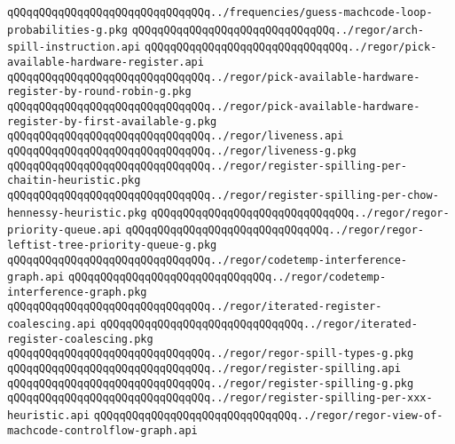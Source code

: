 \verb|qQQqqQQqqQQqqQQqqQQqqQQqqQQqqQQq../frequencies/guess-machcode-loop-probabilities-g.pkg|\newline
\verb|qQQqqQQqqQQqqQQqqQQqqQQqqQQqqQQq../regor/arch-spill-instruction.api|\newline
\verb|qQQqqQQqqQQqqQQqqQQqqQQqqQQqqQQq../regor/pick-available-hardware-register.api|\newline
\verb|qQQqqQQqqQQqqQQqqQQqqQQqqQQqqQQq../regor/pick-available-hardware-register-by-round-robin-g.pkg|\newline
\verb|qQQqqQQqqQQqqQQqqQQqqQQqqQQqqQQq../regor/pick-available-hardware-register-by-first-available-g.pkg|\newline
\verb|qQQqqQQqqQQqqQQqqQQqqQQqqQQqqQQq../regor/liveness.api|\newline
\verb|qQQqqQQqqQQqqQQqqQQqqQQqqQQqqQQq../regor/liveness-g.pkg|\newline
\verb|qQQqqQQqqQQqqQQqqQQqqQQqqQQqqQQq../regor/register-spilling-per-chaitin-heuristic.pkg|\newline
\verb|qQQqqQQqqQQqqQQqqQQqqQQqqQQqqQQq../regor/register-spilling-per-chow-hennessy-heuristic.pkg|\newline
\verb|qQQqqQQqqQQqqQQqqQQqqQQqqQQqqQQq../regor/regor-priority-queue.api|\newline
\verb|qQQqqQQqqQQqqQQqqQQqqQQqqQQqqQQq../regor/regor-leftist-tree-priority-queue-g.pkg|\newline
\verb|qQQqqQQqqQQqqQQqqQQqqQQqqQQqqQQq../regor/codetemp-interference-graph.api|\newline
\verb|qQQqqQQqqQQqqQQqqQQqqQQqqQQqqQQq../regor/codetemp-interference-graph.pkg|\newline
\verb|qQQqqQQqqQQqqQQqqQQqqQQqqQQqqQQq../regor/iterated-register-coalescing.api|\newline
\verb|qQQqqQQqqQQqqQQqqQQqqQQqqQQqqQQq../regor/iterated-register-coalescing.pkg|\newline
\verb|qQQqqQQqqQQqqQQqqQQqqQQqqQQqqQQq../regor/regor-spill-types-g.pkg|\newline
\verb|qQQqqQQqqQQqqQQqqQQqqQQqqQQqqQQq../regor/register-spilling.api|\newline
\verb|qQQqqQQqqQQqqQQqqQQqqQQqqQQqqQQq../regor/register-spilling-g.pkg|\newline
\verb|qQQqqQQqqQQqqQQqqQQqqQQqqQQqqQQq../regor/register-spilling-per-xxx-heuristic.api|\newline
\verb|qQQqqQQqqQQqqQQqqQQqqQQqqQQqqQQq../regor/regor-view-of-machcode-controlflow-graph.api|\newline
